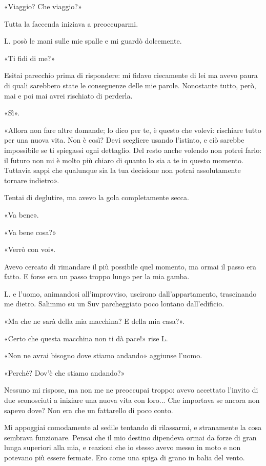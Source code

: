\documentclass[a4paper,12pt]{book}
\begin{document}
«Viaggio? Che viaggio?»

Tutta la faccenda iniziava a preoccuparmi.

L. posò le mani sulle mie spalle e mi guardò dolcemente.

«Ti fidi di me?»

Esitai parecchio prima di rispondere: mi fidavo ciecamente di lei ma avevo
paura di quali sarebbero state le conseguenze delle mie parole. Nonostante
tutto, però, mai e poi mai avrei rischiato di perderla.

«Sì».

«Allora non fare altre domande; lo dico per te, è questo che volevi: rischiare
tutto per una nuova vita. Non è così? Devi scegliere usando l'istinto, e
ciò sarebbe impossibile se ti spiegassi ogni dettaglio. Del resto anche
volendo non potrei farlo: il futuro non mi è molto più chiaro di quanto lo
sia a te in questo momento. Tuttavia sappi che qualunque sia la tua decisione
non potrai assolutamente tornare indietro».

Tentai di deglutire, ma avevo la gola completamente secca.

«Va bene».

«Va bene cosa?»

«Verrò con voi».

Avevo cercato di rimandare il più possibile quel momento, ma ormai il passo era
fatto. E forse era un passo troppo lungo per la mia gamba.

L. e l'uomo, animandosi all'improvviso, uscirono dall'appartamento, trascinando
me dietro. Salimmo su un Suv parcheggiato poco lontano dall'edificio.

«Ma che ne sarà della mia macchina? E della mia casa?».

«Certo che questa macchina non ti dà pace!» rise L.

«Non ne avrai bisogno dove stiamo andando» aggiunse l'uomo.

«Perché? Dov'è che stiamo andando?»

Nessuno mi rispose, ma non me ne preoccupai troppo: avevo accettato l'invito
di due sconosciuti a iniziare una nuova vita con loro... Che importava se ancora
non sapevo dove? Non era che un fattarello di poco conto.

Mi appoggiai comodamente al sedile tentando di rilassarmi, e stranamente la
cosa sembrava funzionare. Pensai che il mio destino dipendeva ormai da forze di
gran lunga superiori alla mia, e reazioni che io stesso avevo messo in moto e
non potevano più essere fermate. Ero come una spiga di grano in balia del
vento.
\end{document}
